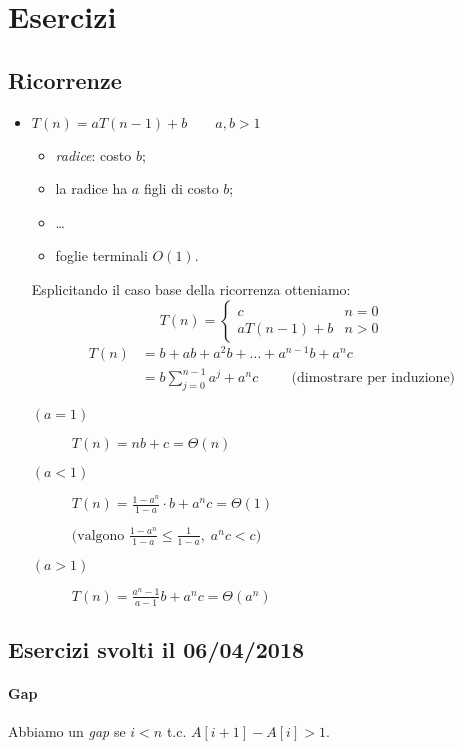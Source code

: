 \section{Esercizi}
\subsection{Ricorrenze}

\begin{itemize}[label=$\bullet$]
	\item $T(n) = aT(n-1) + b \qquad a, b > 1$
	\begin{itemize}
		\item \emph{radice}: costo $b$;
		\item la radice ha $a$ figli di costo $b$;
		\item \dots
		\item foglie terminali $O(1)$.
	\end{itemize}
	Esplicitando il caso base della ricorrenza otteniamo:
	\[ 
		T(n) =
		\begin{cases}
			c & n = 0 \\
			aT(n-1) + b & n > 0
		\end{cases}
	\]
	\begin{align*}
		T(n) & = b + ab + a^2b + \dots + a^{n-1}b + a^nc \\
		& = b \displaystyle\sum_{j=0}^{n-1}a^j + a^nc \hspace{1cm} \text{(dimostrare per induzione)}
	\end{align*}
	\begin{description}
		\item[$(a=1)$] $T(n) = nb + c = \Theta(n)$
		\item[$(a<1)$] $T(n) = \frac{1-a^n}{1-a} \cdot b + a^n c = \Theta(1)$ \par
		$\text{(valgono } \frac{1-a^n}{1-a} \leq \frac{1}{1-a}, \; a^nc < c \text{)}$
		\item[$(a>1)$] $T(n) = \frac{a^n-1}{a-1}b + a^n c = \Theta(a^n)$
	\end{description}
\end{itemize}

\subsection{Esercizi svolti il 06/04/2018} \label{exs:6-4-2018}

\paragraph{Gap} Abbiamo un \emph{gap} se $i < n$ t.c. $A[i+1] - A[i] > 1$.

